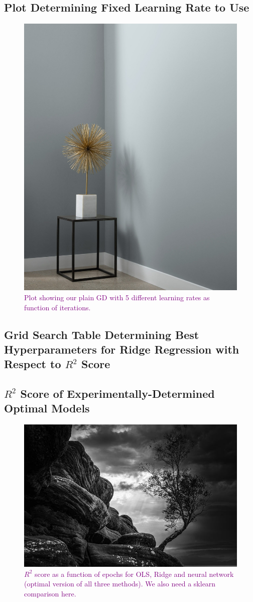 \subsection{Plot Determining Fixed Learning Rate to Use}
\begin{figure}
    \centering
    \includegraphics[width=0.5\linewidth]{figures/placeholders/plainWithDifferentLR.png}
    \caption{\textcolor{purple}{Plot showing our plain GD with 5 different learning rates as function of iterations.}}
    \label{fig:plainWithDifferentLR}
\end{figure}

\subsection{Grid Search Table Determining Best Hyperparameters for Ridge Regression with Respect to $R^2$ Score}

\subsection{$R^2$ Score of Experimentally-Determined Optimal Models}
\begin{figure}
    \centering
    \includegraphics[width=0.5\linewidth]{figures/placeholders/numericalpredictionR2.png}
    \caption{\textcolor{purple}{$R^2$ score as a function of epochs for OLS, Ridge and neural network (optimal version of all three methods). We also need a sklearn comparison here.}}
    \label{fig:numericalpredictionR2}
\end{figure}